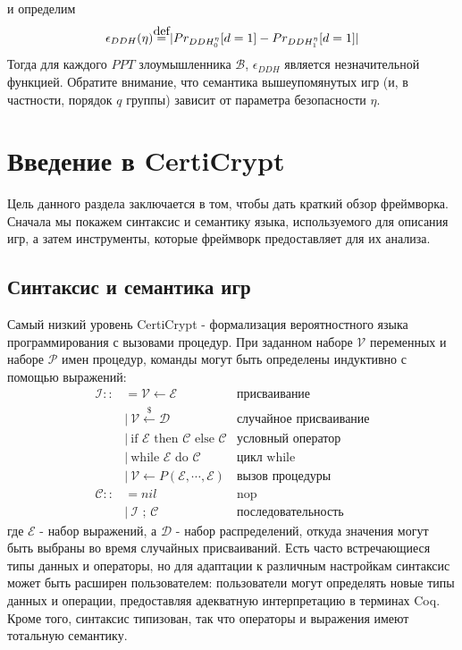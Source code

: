 \documentclass[a4paper,12pt]{report}
\newcommand\myeq{\stackrel{\mathclap{\normalfont\mbox{def}}}{=}}
\begin{document}
и определим
\[ \epsilon_{DDH}(\eta) \myeq \lvert Pr_{DDH^\eta_0}[d = 1] - Pr_{DDH^\eta_1}[d = 1] \rvert  \]
Тогда для каждого $PPT$ злоумышленника $\mathcal{B}$, $\epsilon_{DDH}$ является незначительной функцией. Обратите внимание, что семантика вышеупомянутых игр (и, в частности, порядок $q$ группы) зависит от параметра безопасности $\eta$.
\chapter{Введение в CertiCrypt}
Цель данного раздела заключается в том, чтобы дать краткий обзор фреймворка. Сначала мы покажем синтаксис и семантику языка, используемого для описания игр, а затем инструменты, которые фреймворк предоставляет для их анализа.
\section{Синтаксис и семантика игр}
Самый низкий уровень CertiCrypt - формализация вероятностного языка программирования с вызовами процедур. При заданном наборе $\mathcal{V}$ переменных и наборе $\mathcal{P}$ имен процедур, команды могут быть определены индуктивно с помощью выражений:
\begin{align*}
  \mathcal{I} ::&= \mathcal{V} \gets \mathcal{E} & \text{присваивание} \\
                &\lvert \  \mathcal{V} \xleftarrow{\$} \mathcal{D} & \text{случайное присваивание} \\
                &\lvert \ \text{if } \mathcal{E} \text{ then } \mathcal{C}  \text{ else } \mathcal{C}  & \text{условный оператор} \\
                &\lvert \ \text{while } \mathcal{E} \text{ do } \mathcal{C}  & \text{цикл while} \\
                &\lvert \ \mathcal{V} \gets P(\mathcal{E},  \cdots, \mathcal{E}) & \text{вызов процедуры} \\
  \mathcal{C} ::&= nil & \text{nop}  \\
                &\lvert \ \mathcal{I} \text{ ; } \mathcal{C} & \text{последовательность}   
\end{align*}
где $\mathcal{E}$ - набор выражений, а $\mathcal{D}$ - набор распределений, откуда значения могут быть выбраны во время случайных присваиваний. Есть часто встречающиеся типы данных и операторы, но для адаптации к различным настройкам синтаксис может быть расширен пользователем: пользователи могут определять новые типы данных и операции, предоставляя адекватную интерпретацию в терминах Coq. Кроме того, синтаксис типизован, так что операторы и выражения имеют тотальную семантику.
\end{document}
